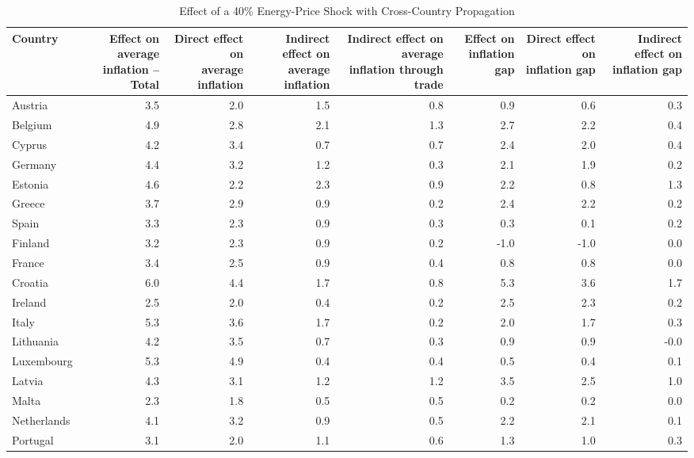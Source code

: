 \begin{table}[H]
\centering
\caption{Effect of a 40\% Energy-Price Shock with Cross-Country Propagation}
\scriptsize
\setlength{\tabcolsep}{1.2pt}
\begin{tabular}{lrrrrrrr}
\toprule
Country & \shortstack{Effect on average\\inflation -- Total} & \shortstack{Direct effect on\\average inflation} & \shortstack{Indirect effect on\\average inflation} & \shortstack{Indirect effect on average\\inflation through trade} & \shortstack{Effect on\\inflation gap} & \shortstack{Direct effect on\\inflation gap} & \shortstack{Indirect effect on\\inflation gap}
 \\
\midrule
Austria & 3.5 & 2.0 & 1.5 & 0.8 & 0.9 & 0.6 & 0.3
 \\
Belgium & 4.9 & 2.8 & 2.1 & 1.3 & 2.7 & 2.2 & 0.4
 \\
Cyprus & 4.2 & 3.4 & 0.7 & 0.7 & 2.4 & 2.0 & 0.4
 \\
Germany & 4.4 & 3.2 & 1.2 & 0.3 & 2.1 & 1.9 & 0.2
 \\
Estonia & 4.6 & 2.2 & 2.3 & 0.9 & 2.2 & 0.8 & 1.3
 \\
Greece & 3.7 & 2.9 & 0.9 & 0.2 & 2.4 & 2.2 & 0.2
 \\
Spain & 3.3 & 2.3 & 0.9 & 0.3 & 0.3 & 0.1 & 0.2
 \\
Finland & 3.2 & 2.3 & 0.9 & 0.2 & -1.0 & -1.0 & 0.0
 \\
France & 3.4 & 2.5 & 0.9 & 0.4 & 0.8 & 0.8 & 0.0
 \\
Croatia & 6.0 & 4.4 & 1.7 & 0.8 & 5.3 & 3.6 & 1.7
 \\
Ireland & 2.5 & 2.0 & 0.4 & 0.2 & 2.5 & 2.3 & 0.2
 \\
Italy & 5.3 & 3.6 & 1.7 & 0.2 & 2.0 & 1.7 & 0.3
 \\
Lithuania & 4.2 & 3.5 & 0.7 & 0.3 & 0.9 & 0.9 & -0.0
 \\
Luxembourg & 5.3 & 4.9 & 0.4 & 0.4 & 0.5 & 0.4 & 0.1
 \\
Latvia & 4.3 & 3.1 & 1.2 & 1.2 & 3.5 & 2.5 & 1.0
 \\
Malta & 2.3 & 1.8 & 0.5 & 0.5 & 0.2 & 0.2 & 0.0
 \\
Netherlands & 4.1 & 3.2 & 0.9 & 0.5 & 2.2 & 2.1 & 0.1
 \\
Portugal & 3.1 & 2.0 & 1.1 & 0.6 & 1.3 & 1.0 & 0.3

\end{tabular}
\end{table}

